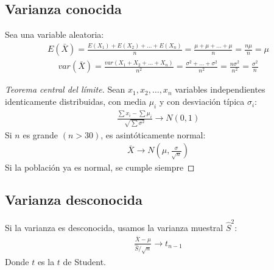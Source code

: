 \documentclass{article}
\begin{document}
\subsection{Varianza conocida}
Sea una variable aleatoria:
\begin{equation}
    \begin{split}
        E(\bar{X}) = \frac{E(X_{1})+E(X_{2})+\dots+E(X_{n})}{n}= \frac{\mu +\mu +\dots+\mu }{n}
        = \frac{n \mu }{n} = \mu 
    \end{split}
\end{equation}
\begin{equation}
    \begin{split}
        var(\bar{X})= \frac{var(X_{1}+X_{2}+\dots +X_{n})}{n^{2}}= \frac{\sigma^{2}+\dots+\sigma^{2}}{n^{2}}
        = \frac{n \sigma^{2}}{n^{2}}= \frac{\sigma^{2}}{n}
    \end{split}
\end{equation}
\begin{proof}[Teorema central del límite]
    Sean $x_{1},x_{2},\dots,x_{n}$ variables independientes identicamente distribuidas, con media
    $\mu _{i}$ y con desviación típica $\sigma _{i}$:
    \begin{equation}
        \begin{split}
            \frac{\sum x_{i}-\sum \mu _{i}}{\sqrt{\sum \sigma^{2}}} \to N(0,1)
        \end{split}
    \end{equation}
    Si $n$ es grande $(n>30)$, es asintóticamente normal:
    \begin{equation}
        \begin{split}
            \bar{X} \to N(\mu , \frac{\sigma }{\sqrt{n}})
        \end{split}
    \end{equation}
    Si la población ya es normal, se cumple siempre
\end{proof}
\subsection{Varianza desconocida}
Si la varianza es desconocida, usamos la varianza muestral $\hat{S}^{2}$:
\begin{equation}
    \begin{split}
        \frac{\bar{X}-\mu }{\hat{S} / \sqrt{n}} \to t_{n-1}
    \end{split}
\end{equation}
Donde $t$ es la $t$ de Student.
\end{document}
